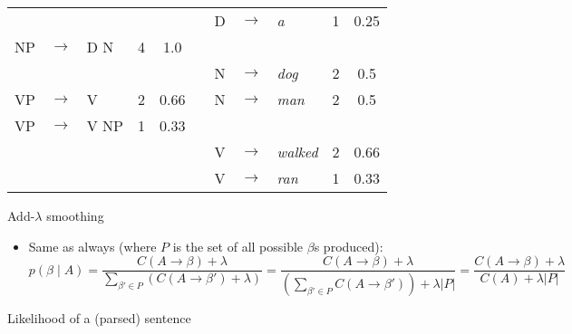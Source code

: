 \documentclass[11pt,letterpaper]{article}
\newcommand{\ra}{\rightarrow}
\begin{document}
\begin{itemize}
\begin{center}
\begin{tabular}{lllcc p{13mm} lllcc}
	     &       &          &                &                  &&  D & $\ra$ & \textit{a}        & 1              & 0.25             \\
	  NP & $\ra$ & D N      &  4             & 1.0              &&    &       &                   &                &                  \\
	     &       &          &                &                  &&  N & $\ra$ & \textit{dog}      & 2              & 0.5              \\
	  VP & $\ra$ & V        &  2             & 0.66             &&  N & $\ra$ & \textit{man}      & 2              & 0.5              \\
	  VP & $\ra$ & V NP     &  1             & 0.33             \\
	     &       &          &                &                  &&  V & $\ra$ & \textit{walked}   & 2              & 0.66             \\
	     &       &          &                &                  &&  V & $\ra$ & \textit{ran}      & 1              & 0.33             
	\end{tabular}
	\end{center}
\end{itemize}


Add-$\lambda$ smoothing

\begin{itemize}
  \item Same as always (where $P$ is the set of all possible $\beta$s produced):
    \[ p(\beta \mid A) 
      = \frac{C(A \ra\beta)+\lambda}{\sum_{\beta' \in P} (C(A \ra\beta')+\lambda)} 
      = \frac{C(A \ra\beta)+\lambda}{(\sum_{\beta' \in P} C(A \ra\beta'))+\lambda|P|} 
      = \frac{C(A \ra\beta)+\lambda}{C(A)+\lambda|P|} \]
\end{itemize}


Likelihood of a (parsed) sentence
\end{document}
